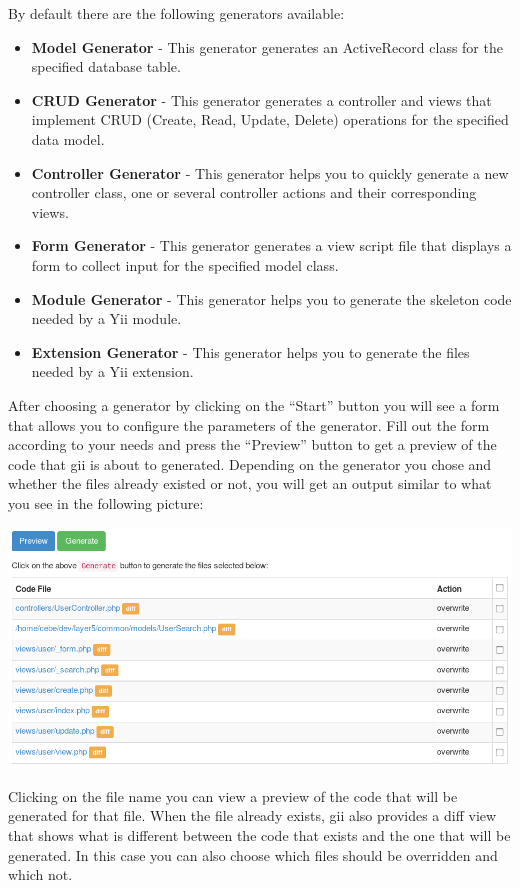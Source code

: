 By default there are the following generators available:

\begin{itemize}
\item \textbf{Model Generator} - This generator generates an ActiveRecord class for the specified database table.
\item \textbf{CRUD Generator} - This generator generates a controller and views that implement CRUD (Create, Read, Update, Delete)
operations for the specified data model.
\item \textbf{Controller Generator} - This generator helps you to quickly generate a new controller class, one or several
controller actions and their corresponding views.
\item \textbf{Form Generator} - This generator generates a view script file that displays a form to collect input for the
specified model class.
\item \textbf{Module Generator} - This generator helps you to generate the skeleton code needed by a Yii module.
\item \textbf{Extension Generator} - This generator helps you to generate the files needed by a Yii extension.
\end{itemize}
After choosing a generator by clicking on the ``Start'' button you will see a form that allows you to configure the
parameters of the generator. Fill out the form according to your needs and press the ``Preview'' button to get a
preview of the code that gii is about to generated. Depending on the generator you chose and whether the files
already existed or not, you will get an output similar to what you see in the following picture:

\noindent\includegraphics[width=\textwidth]{images/gii-preview.png}

Clicking on the file name you can view a preview of the code that will be generated for that file.
When the file already exists, gii also provides a diff view that shows what is different between the code that exists
and the one that will be generated. In this case you can also choose which files should be overridden and which not.

